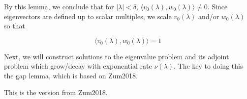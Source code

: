 \documentclass[12pt]{article}
\begin{document}
By this lemma, we conclude that for $|\lambda| < \delta$, $\langle v_0(\lambda), w_0(\lambda) \rangle \neq 0$. Since eigenvectors are defined up to scalar multiples, we scale $v_0(\lambda)$ and/or $w_0(\lambda)$ so that

\begin{equation}\label{v0w0IP1}
\langle v_0(\lambda), w_0(\lambda) \rangle = 1
\end{equation}

Next, we will construct solutions to the eigenvalue problem and its adjoint problem which grow/decay with exponential rate $\nu(\lambda)$. The key to doing this the gap lemma, which is based on Zum2018.


This is the version from Zum2018.
\end{document}
